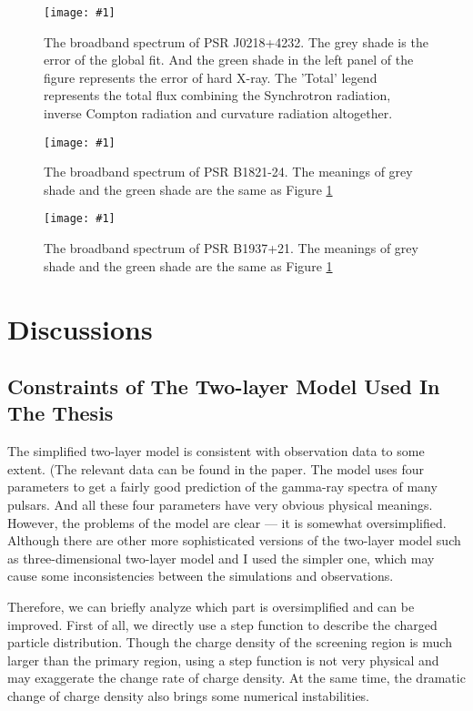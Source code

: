 \documentclass[12pt]{report}
\newcommand{\singleFig}[3]{
  \begin{figure}[!htp]
    \centering
    \texttt{[image: \#1]}
    \caption{#3}
    \label{fig: #1}
  \end{figure}
}
\begin{document}
    \singleFig{j0218_twolayer_all.png}{0.37}{The broadband spectrum of PSR J0218+4232.
      The grey shade is the error of the global fit. And the green shade in the left panel of 
      the figure represents the error of hard X-ray. The 'Total' legend represents the total 
      flux combining the Synchrotron radiation, inverse Compton radiation and curvature 
      radiation altogether.}
    \vspace{0.5cm} 
    
    \singleFig{b1821_twolayer_all.png}{0.37}{The broadband spectrum of PSR B1821-24.
      The meanings of grey shade and the green shade are the same as Figure \ref{fig: j0218_twolayer_all.png}}
    \vspace{0.5cm} 
      
    \singleFig{j1939_twolayer_all_ave.png}{0.39}{The broadband spectrum of PSR B1937+21.
      The meanings of grey shade and the green shade are the same as Figure
      \ref{fig: j0218_twolayer_all.png}}
    \vspace{0.5cm}        


\chapter{Discussions}
  \section{Constraints of The Two-layer Model Used In The Thesis} 
    The simplified two-layer model is consistent with observation data to some extent. 
    (The relevant data can be found in the paper. \citep{0004-637X-720-1-178}
    The model uses four parameters to get a fairly good prediction of the gamma-ray 
    spectra of many pulsars. And all these four parameters have very obvious physical 
    meanings. However, the problems of the model are clear --- it is somewhat 
    oversimplified. Although there are other more sophisticated versions of the 
    two-layer model such as three-dimensional two-layer model 
    \citep{doi:10.1111/j.1365-2966.2011.18577.x} and I used the simpler 
    one, which may cause some inconsistencies between the simulations and observations. 

    Therefore, we can briefly analyze which part is oversimplified and can be improved. 
    First of all, we directly use a step function to describe the charged particle 
    distribution. Though the charge density of the screening region is much larger than 
    the primary region, using a step function is not very physical and may exaggerate 
    the change rate of charge density. At the same time, the dramatic change of charge 
    density also brings some numerical instabilities.
\end{document}
